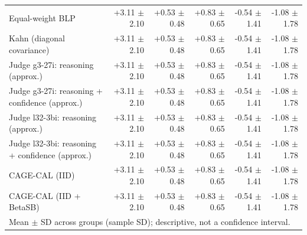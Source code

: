 \begin{tabular}{lrrrrr}
Equal-weight BLP & +3.11 {\scriptsize $\pm$ 2.10} & +0.53 {\scriptsize $\pm$ 0.48} & +0.83 {\scriptsize $\pm$ 0.65} & -0.54 {\scriptsize $\pm$ 1.41} & -1.08 {\scriptsize $\pm$ 1.78} \\
Kahn (diagonal covariance) & +3.11 {\scriptsize $\pm$ 2.10} & +0.53 {\scriptsize $\pm$ 0.48} & +0.83 {\scriptsize $\pm$ 0.65} & -0.54 {\scriptsize $\pm$ 1.41} & -1.08 {\scriptsize $\pm$ 1.78} \\
Judge g3-27i: reasoning (approx.) & +3.11 {\scriptsize $\pm$ 2.10} & +0.53 {\scriptsize $\pm$ 0.48} & +0.83 {\scriptsize $\pm$ 0.65} & -0.54 {\scriptsize $\pm$ 1.41} & -1.08 {\scriptsize $\pm$ 1.78} \\
Judge g3-27i: reasoning + confidence (approx.) & +3.11 {\scriptsize $\pm$ 2.10} & +0.53 {\scriptsize $\pm$ 0.48} & +0.83 {\scriptsize $\pm$ 0.65} & -0.54 {\scriptsize $\pm$ 1.41} & -1.08 {\scriptsize $\pm$ 1.78} \\
Judge l32-3bi: reasoning (approx.) & +3.11 {\scriptsize $\pm$ 2.10} & +0.53 {\scriptsize $\pm$ 0.48} & +0.83 {\scriptsize $\pm$ 0.65} & -0.54 {\scriptsize $\pm$ 1.41} & -1.08 {\scriptsize $\pm$ 1.78} \\
Judge l32-3bi: reasoning + confidence (approx.) & +3.11 {\scriptsize $\pm$ 2.10} & +0.53 {\scriptsize $\pm$ 0.48} & +0.83 {\scriptsize $\pm$ 0.65} & -0.54 {\scriptsize $\pm$ 1.41} & -1.08 {\scriptsize $\pm$ 1.78} \\
CAGE-CAL (IID) & +3.11 {\scriptsize $\pm$ 2.10} & +0.53 {\scriptsize $\pm$ 0.48} & +0.83 {\scriptsize $\pm$ 0.65} & -0.54 {\scriptsize $\pm$ 1.41} & -1.08 {\scriptsize $\pm$ 1.78} \\
CAGE-CAL (IID + BetaSB) & +3.11 {\scriptsize $\pm$ 2.10} & +0.53 {\scriptsize $\pm$ 0.48} & +0.83 {\scriptsize $\pm$ 0.65} & -0.54 {\scriptsize $\pm$ 1.41} & -1.08 {\scriptsize $\pm$ 1.78} \\
\bottomrule
\multicolumn{6}{l}{\scriptsize Mean $\pm$ SD across groups (sample SD); descriptive, not a confidence interval.} \\
\end{tabular}
